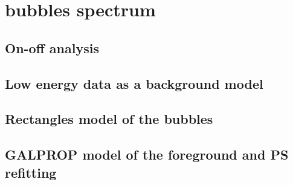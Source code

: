 \section{\Fermi bubbles spectrum}

\subsection{On-off analysis}


\subsection{Low energy data as a background model}


\subsection{Rectangles model of the bubbles}


\subsection{GALPROP model of the foreground and PS refitting}



